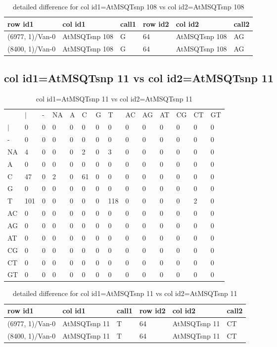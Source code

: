 \begin{center}
\begin{longtable}{|l|l|l|l|l|l|}
\caption{detailed difference for col id1=AtMSQTsnp 108 vs col id2=AtMSQTsnp 108} \label{table_dm691}\\
\hline
row id1&col id1&call1&row id2&col id2&call2\\
\hline
(6977, 1)/Van-0&AtMSQTsnp 108&G&64&AtMSQTsnp 108&AG\\
(8400, 1)/Van-0&AtMSQTsnp 108&G&64&AtMSQTsnp 108&AG\\
\hline
\end{longtable}
\end{center}

\subsection{col id1=AtMSQTsnp 11 vs col id2=AtMSQTsnp 11}
\begin{center}
\begin{longtable}{|l|l|l|l|l|l|l|l|l|l|l|l|l|l|}
\caption{col id1=AtMSQTsnp 11 vs col id2=AtMSQTsnp 11} \label{table_dm692}\\
\hline
\\
\hline
&$|$&-&NA&A&C&G&T&AC&AG&AT&CG&CT&GT\\
$|$&0&0&0&0&0&0&0&0&0&0&0&0&0\\
-&0&0&0&0&0&0&0&0&0&0&0&0&0\\
NA&4&0&0&0&2&0&3&0&0&0&0&0&0\\
A&0&0&0&0&0&0&0&0&0&0&0&0&0\\
C&47&0&2&0&61&0&0&0&0&0&0&0&0\\
G&0&0&0&0&0&0&0&0&0&0&0&0&0\\
T&101&0&0&0&0&0&118&0&0&0&0&2&0\\
AC&0&0&0&0&0&0&0&0&0&0&0&0&0\\
AG&0&0&0&0&0&0&0&0&0&0&0&0&0\\
AT&0&0&0&0&0&0&0&0&0&0&0&0&0\\
CG&0&0&0&0&0&0&0&0&0&0&0&0&0\\
CT&0&0&0&0&0&0&0&0&0&0&0&0&0\\
GT&0&0&0&0&0&0&0&0&0&0&0&0&0\\
\hline
\end{longtable}
\end{center}

\begin{center}
\begin{longtable}{|l|l|l|l|l|l|}
\caption{detailed difference for col id1=AtMSQTsnp 11 vs col id2=AtMSQTsnp 11} \label{table_dm693}\\
\hline
row id1&col id1&call1&row id2&col id2&call2\\
\hline
(6977, 1)/Van-0&AtMSQTsnp 11&T&64&AtMSQTsnp 11&CT\\
(8400, 1)/Van-0&AtMSQTsnp 11&T&64&AtMSQTsnp 11&CT\\
\hline
\end{longtable}
\end{center}

